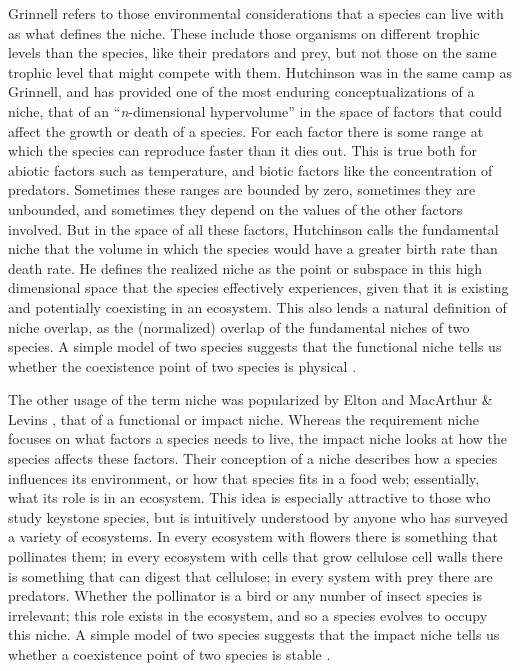 \documentclass[a4paper,11pt]{article}
\numberwithin{equation}{section} %
\begin{document}
Grinnell \cite{Grinnell1917} refers to those environmental considerations that a species can live with as what defines the niche. 
These include those organisms on different trophic levels than the species, like their predators and prey, but not those on the same trophic level that might compete with them. 
Hutchinson \cite{Hutchinson1957} was in the same camp as Grinnell, and has provided one of the most enduring conceptualizations of a niche, that of an ``\emph{n}-dimensional hypervolume'' in the space of factors that could affect the growth or death of a species. 
For each factor there is some range at which the species can reproduce faster than it dies out. 
This is true both for abiotic factors such as temperature, and biotic factors like the concentration of predators. 
Sometimes these ranges are bounded by zero, sometimes they are unbounded, and sometimes they depend on the values of the other factors involved. 
But in the space of all these factors, Hutchinson calls the fundamental niche that the volume in which the species would have a greater birth rate than death rate. 
He defines the realized niche as the point or subspace in this high dimensional space that the species effectively experiences, given that it is existing and potentially coexisting in an ecosystem. 
This also lends a natural definition of niche overlap, as the (normalized) overlap of the fundamental niches of two species. 
A simple model of two species suggests that the functional niche tells us whether the coexistence point of two species is physical \cite{checkit}. 

The other usage of the term niche was popularized by Elton \cite{Elton1927} and MacArthur \& Levins \cite{MacArthur1967}, that of a functional or impact niche. 
Whereas the requirement niche focuses on what factors a species needs to live, the impact niche looks at how the species affects these factors. 
Their conception of a niche describes how a species influences its environment, or how that species fits in a food web; essentially, what its role is in an ecosystem. 
This idea is especially attractive to those who study keystone species, but is intuitively understood by anyone who has surveyed a variety of ecosystems. 
In every ecosystem with flowers there is something that pollinates them; in every ecosystem with cells that grow cellulose cell walls there is something that can digest that cellulose; in every system with prey there are predators. %
Whether the pollinator is a bird or any number of insect species is irrelevant; this role exists in the ecosystem, and so a species evolves to occupy this niche. 
A simple model of two species suggests that the impact niche tells us whether a coexistence point of two species is stable \cite{checkit}. 
\end{document}
